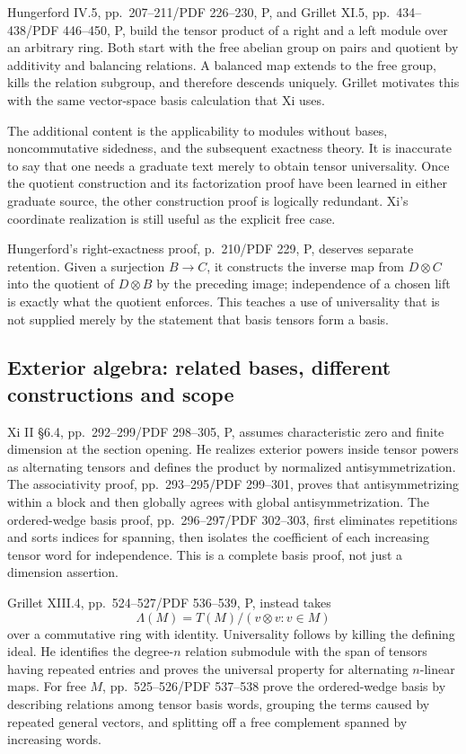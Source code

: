 \documentclass[
  11pt,
]{article}
\begin{document}
Hungerford IV.5, pp.~207--211/PDF 226--230, P, and Grillet XI.5,
pp.~434--438/PDF 446--450, P, build the tensor product of a right and a
left module over an arbitrary ring. Both start with the free abelian
group on pairs and quotient by additivity and balancing relations. A
balanced map extends to the free group, kills the relation subgroup, and
therefore descends uniquely. Grillet motivates this with the same
vector-space basis calculation that Xi uses.

The additional content is the applicability to modules without bases,
noncommutative sidedness, and the subsequent exactness theory. It is
inaccurate to say that one needs a graduate text merely to obtain tensor
universality. Once the quotient construction and its factorization proof
have been learned in either graduate source, the other construction
proof is logically redundant. Xi's coordinate realization is still
useful as the explicit free case.

Hungerford's right-exactness proof, p.~210/PDF 229, P, deserves separate
retention. Given a surjection \(B\to C\), it constructs the inverse map
from \(D\otimes C\) into the quotient of \(D\otimes B\) by the preceding
image; independence of a chosen lift is exactly what the quotient
enforces. This teaches a use of universality that is not supplied merely
by the statement that basis tensors form a basis.

\subsection{Exterior algebra: related bases, different constructions and
scope}\label{exterior-algebra-related-bases-different-constructions-and-scope}

Xi II §6.4, pp.~292--299/PDF 298--305, P, assumes characteristic zero
and finite dimension at the section opening. He realizes exterior powers
inside tensor powers as alternating tensors and defines the product by
normalized antisymmetrization. The associativity proof, pp.~293--295/PDF
299--301, proves that antisymmetrizing within a block and then globally
agrees with global antisymmetrization. The ordered-wedge basis proof,
pp.~296--297/PDF 302--303, first eliminates repetitions and sorts
indices for spanning, then isolates the coefficient of each increasing
tensor word for independence. This is a complete basis proof, not just a
dimension assertion.

Grillet XIII.4, pp.~524--527/PDF 536--539, P, instead takes \[
\Lambda(M)=T(M)/(v\otimes v:v\in M)
\] over a commutative ring with identity. Universality follows by
killing the defining ideal. He identifies the degree-\(n\) relation
submodule with the span of tensors having repeated entries and proves
the universal property for alternating \(n\)-linear maps. For free
\(M\), pp.~525--526/PDF 537--538 prove the ordered-wedge basis by
describing relations among tensor basis words, grouping the terms caused
by repeated general vectors, and splitting off a free complement spanned
by increasing words.
\end{document}
